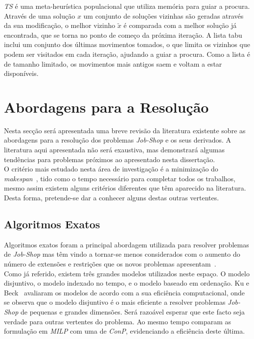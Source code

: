 \textit{TS} é uma meta-heurística populacional que utiliza memória para guiar a procura. Através de uma solução $x$ um conjunto de soluções vizinhas são geradas através da sua modificação, o melhor vizinho $\tilde{x}$ é comparada com a melhor solução já encontrada, que se torna no ponto de começo da próxima iteração. A lista tabu inclui um conjunto dos últimas movimentos tomados, o que limita os vizinhos que podem ser visitados em cada iteração, ajudando a guiar a procura. Como a lista é de tamanho limitado, os movimentos mais antigos saem e voltam a estar disponíveis.\\

\section{Abordagens para a Resolução}
\label{sec:abordagens_para_a_resolução}

Nesta secção será apresentada uma breve revisão da literatura existente sobre as abordagens para a resolução dos problemas \textit{Job-Shop} e os seus derivados. A literatura aqui apresentada não será exaustiva, mas demonstrará algumas tendências para problemas próximos ao apresentado nesta dissertação.\\
O critério mais estudado nesta área de investigação é a minimização do \textit{makespan}~\cite{xiongSurveyJobShop2022}, tido como o tempo necessário para completar todos os trabalhos, mesmo assim existem alguns critérios diferentes que têm aparecido na literatura. Desta forma, pretende-se dar a conhecer alguns destas outras vertentes.\\

\subsection{Algoritmos Exatos}

Algoritmos exatos foram a principal abordagem utilizada para resolver problemas de \textit{Job-Shop} mas têm vindo a tornar-se menos considerados com o aumento do número de extensões e restrições que os novos problemas apresentam~\cite{jiangReviewIntelligentScheduling2023}.\\

Como já referido, existem três grandes modelos utilizados neste espaço. O modelo disjuntivo, o modelo indexado no tempo, e o modelo baseado em ordenação. Ku e Beck~\cite{kuMixedIntegerProgramming2016} avaliaram os modelos de acordo com a sua eficiência computacional, onde se observa que o modelo disjuntivo é o mais eficiente a resolver problemas \textit{Job-Shop} de pequenas e grandes dimensões. Será razoável esperar que este facto seja verdade para outras vertentes do problema. Ao mesmo tempo comparam as formulação em \textit{MILP} com uma de \textit{ConP}, evidenciando a eficiência deste última.\\

